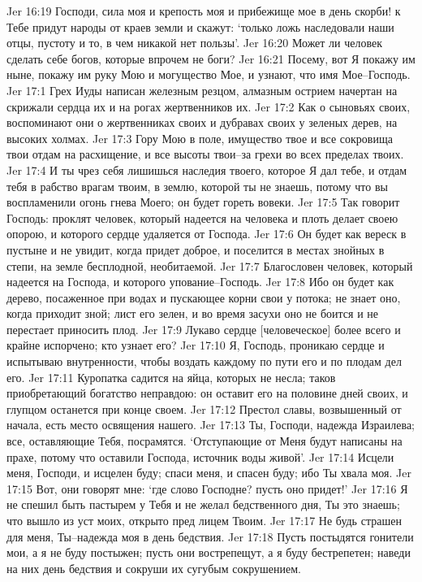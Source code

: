 Jer 16:19  Господи, сила моя и крепость моя и прибежище мое в день скорби! к Тебе придут народы от краев земли и скажут: `только ложь наследовали наши отцы, пустоту и то, в чем никакой нет пользы'.
Jer 16:20  Может ли человек сделать себе богов, которые впрочем не боги?
Jer 16:21  Посему, вот Я покажу им ныне, покажу им руку Мою и могущество Мое, и узнают, что имя Мое--Господь.
Jer 17:1  Грех Иуды написан железным резцом, алмазным острием начертан на скрижали сердца их и на рогах жертвенников их.
Jer 17:2  Как о сыновьях своих, воспоминают они о жертвенниках своих и дубравах своих у зеленых дерев, на высоких холмах.
Jer 17:3  Гору Мою в поле, имущество твое и все сокровища твои отдам на расхищение, и все высоты твои--за грехи во всех пределах твоих.
Jer 17:4  И ты чрез себя лишишься наследия твоего, которое Я дал тебе, и отдам тебя в рабство врагам твоим, в землю, которой ты не знаешь, потому что вы воспламенили огонь гнева Моего; он будет гореть вовеки.
Jer 17:5  Так говорит Господь: проклят человек, который надеется на человека и плоть делает своею опорою, и которого сердце удаляется от Господа.
Jer 17:6  Он будет как вереск в пустыне и не увидит, когда придет доброе, и поселится в местах знойных в степи, на земле бесплодной, необитаемой.
Jer 17:7  Благословен человек, который надеется на Господа, и которого упование--Господь.
Jer 17:8  Ибо он будет как дерево, посаженное при водах и пускающее корни свои у потока; не знает оно, когда приходит зной; лист его зелен, и во время засухи оно не боится и не перестает приносить плод.
Jer 17:9  Лукаво сердце [человеческое] более всего и крайне испорчено; кто узнает его?
Jer 17:10  Я, Господь, проникаю сердце и испытываю внутренности, чтобы воздать каждому по пути его и по плодам дел его.
Jer 17:11  Куропатка садится на яйца, которых не несла; таков приобретающий богатство неправдою: он оставит его на половине дней своих, и глупцом останется при конце своем.
Jer 17:12  Престол славы, возвышенный от начала, есть место освящения нашего.
Jer 17:13  Ты, Господи, надежда Израилева; все, оставляющие Тебя, посрамятся. `Отступающие от Меня будут написаны на прахе, потому что оставили Господа, источник воды живой'.
Jer 17:14  Исцели меня, Господи, и исцелен буду; спаси меня, и спасен буду; ибо Ты хвала моя.
Jer 17:15  Вот, они говорят мне: `где слово Господне? пусть оно придет!'
Jer 17:16  Я не спешил быть пастырем у Тебя и не желал бедственного дня, Ты это знаешь; что вышло из уст моих, открыто пред лицем Твоим.
Jer 17:17  Не будь страшен для меня, Ты--надежда моя в день бедствия.
Jer 17:18  Пусть постыдятся гонители мои, а я не буду постыжен; пусть они вострепещут, а я буду бестрепетен; наведи на них день бедствия и сокруши их сугубым сокрушением.
